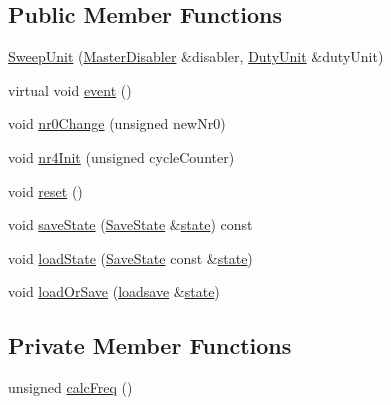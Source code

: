 \subsection*{Public Member Functions}
\begin{DoxyCompactItemize}
\item 
\hyperlink{classgambatte_1_1Channel1_1_1SweepUnit_a1b12e2135d03fe19b7b20d5f7884c2d8}{Sweep\+Unit} (\hyperlink{classgambatte_1_1MasterDisabler}{Master\+Disabler} \&disabler, \hyperlink{classgambatte_1_1DutyUnit}{Duty\+Unit} \&duty\+Unit)
\item 
virtual void \hyperlink{classgambatte_1_1Channel1_1_1SweepUnit_a17c182372fc3f4aaf845ab89cf20201d}{event} ()
\item 
void \hyperlink{classgambatte_1_1Channel1_1_1SweepUnit_a61a441938851b0f4b2c8e7dfc1f2a7fa}{nr0\+Change} (unsigned new\+Nr0)
\item 
void \hyperlink{classgambatte_1_1Channel1_1_1SweepUnit_a2428c20b75eb4d571eb4d6979e15949d}{nr4\+Init} (unsigned cycle\+Counter)
\item 
void \hyperlink{classgambatte_1_1Channel1_1_1SweepUnit_a6aef2b1067cfc9f032b6d386c97ed2bb}{reset} ()
\item 
void \hyperlink{classgambatte_1_1Channel1_1_1SweepUnit_a5d957523fd18c30eb42d47c89fe01a13}{save\+State} (\hyperlink{structgambatte_1_1SaveState}{Save\+State} \&\hyperlink{ppu_8cpp_a2f2eca6997ee7baf8901725ae074d45b}{state}) const
\item 
void \hyperlink{classgambatte_1_1Channel1_1_1SweepUnit_a878dc87fd614f8cec90fdccb55e56736}{load\+State} (\hyperlink{structgambatte_1_1SaveState}{Save\+State} const \&\hyperlink{ppu_8cpp_a2f2eca6997ee7baf8901725ae074d45b}{state})
\item 
void \hyperlink{classgambatte_1_1Channel1_1_1SweepUnit_aad7f6073e9f8ab5faf059ee1b4659e7b}{load\+Or\+Save} (\hyperlink{classgambatte_1_1loadsave}{loadsave} \&\hyperlink{ppu_8cpp_a2f2eca6997ee7baf8901725ae074d45b}{state})
\end{DoxyCompactItemize}
\subsection*{Private Member Functions}
\begin{DoxyCompactItemize}
\item 
unsigned \hyperlink{classgambatte_1_1Channel1_1_1SweepUnit_ad5b8441b3bc35077ace9f661f4128a4d}{calc\+Freq} ()
\end{DoxyCompactItemize}
